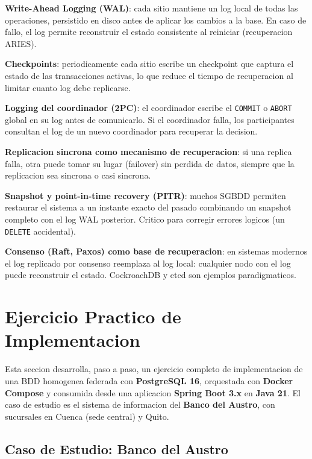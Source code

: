 \documentclass[11pt,a4paper]{article}
\begin{document}
\textbf{Write-Ahead Logging (WAL)}: cada sitio mantiene un log local de todas las operaciones, persistido en disco antes de aplicar los cambios a la base. En caso de fallo, el log permite reconstruir el estado consistente al reiniciar (recuperacion ARIES).

\textbf{Checkpoints}: periodicamente cada sitio escribe un checkpoint que captura el estado de las transacciones activas, lo que reduce el tiempo de recuperacion al limitar cuanto log debe replicarse.

\textbf{Logging del coordinador (2PC)}: el coordinador escribe el \texttt{COMMIT} o \texttt{ABORT} global en su log antes de comunicarlo. Si el coordinador falla, los participantes consultan el log de un nuevo coordinador para recuperar la decision.

\textbf{Replicacion sincrona como mecanismo de recuperacion}: si una replica falla, otra puede tomar su lugar (failover) sin perdida de datos, siempre que la replicacion sea sincrona o casi sincrona.

\textbf{Snapshot y point-in-time recovery (PITR)}: muchos SGBDD permiten restaurar el sistema a un instante exacto del pasado combinando un snapshot completo con el log WAL posterior. Critico para corregir errores logicos (un \texttt{DELETE} accidental).

\textbf{Consenso (Raft, Paxos) como base de recuperacion}: en sistemas modernos el log replicado por consenso reemplaza al log local: cualquier nodo con el log puede reconstruir el estado. CockroachDB y etcd son ejemplos paradigmaticos.

\section{Ejercicio Practico de Implementacion}

Esta seccion desarrolla, paso a paso, un ejercicio completo de implementacion de una BDD homogenea federada con \textbf{PostgreSQL 16}, orquestada con \textbf{Docker Compose} y consumida desde una aplicacion \textbf{Spring Boot 3.x} en \textbf{Java 21}. El caso de estudio es el sistema de informacion del \textbf{Banco del Austro}, con sucursales en Cuenca (sede central) y Quito.

\subsection{Caso de Estudio: Banco del Austro}
\end{document}
